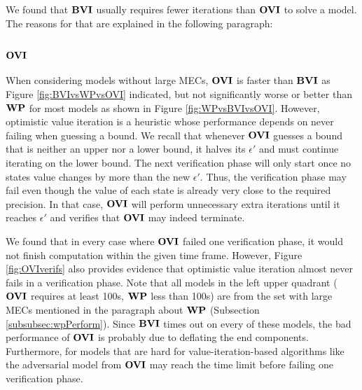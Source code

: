 We found that $\mathbf{BVI}$ usually requires fewer iterations than $\mathbf{OVI}$ to solve a model.
The reasons for that are explained in the following paragraph:

\subsubsection*{\underline{$\mathbf{OVI}$}}
When considering models without large MECs, $\mathbf{OVI}$ is faster than $\mathbf{BVI}$ as Figure \ref{fig:BVIvsWPvsOVI} indicated, but not significantly worse or better than $\mathbf{WP}$ for most models as shown in Figure \ref{fig:WPvsBVIvsOVI}.
However, optimistic value iteration is a heuristic whose performance depends on never failing when guessing a bound.
We recall that whenever $\mathbf{OVI}$ guesses a bound that is neither an upper nor a lower bound, it halves its $\epsilon'$ and must continue iterating on the lower bound.
The next verification phase will only start once no states value changes by more than the new $\epsilon'$.
Thus, the verification phase may fail even though the value of each state is already very close to the required precision.
In that case, $\mathbf{OVI}$ will perform unnecessary extra iterations until it reaches $\epsilon'$ and verifies that $\mathbf{OVI}$ may indeed terminate.

We found that in every case where $\mathbf{OVI}$ failed one verification phase, it would not finish computation within the given time frame.
However, Figure \ref{fig:OVIverifs} also provides evidence that optimistic value iteration almost never fails in a verification phase.
Note that all models in the left upper quadrant ($\mathbf{OVI}$ requires at least 100s, $\mathbf{WP}$ less than 100s) are from the set with large MECs mentioned in the paragraph about $\mathbf{WP}$ (Subsection \ref{subsubsec:wpPerform}).
Since $\mathbf{BVI}$ times out on every of these models, the bad performance of $\mathbf{OVI}$ is probably due to deflating the end components.
Furthermore, for models that are hard for value-iteration-based algorithms like the adversarial model from \cite{haddadmonmege} $\mathbf{OVI}$ may reach the time limit before failing one verification phase.

